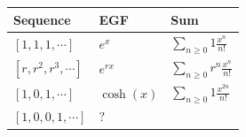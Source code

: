 \begin{longtable}[]{@{}lll@{}}
\toprule
\begin{minipage}[b]{0.30\columnwidth}\raggedright
Sequence\strut
\end{minipage} & \begin{minipage}[b]{0.30\columnwidth}\raggedright
EGF\strut
\end{minipage} & \begin{minipage}[b]{0.30\columnwidth}\raggedright
Sum\strut
\end{minipage}\tabularnewline
\midrule
\endhead
\begin{minipage}[t]{0.30\columnwidth}\raggedright
\([1, 1, 1, \cdots]\)\strut
\end{minipage} & \begin{minipage}[t]{0.30\columnwidth}\raggedright
\(e^x\)\strut
\end{minipage} & \begin{minipage}[t]{0.30\columnwidth}\raggedright
\(\displaystyle\sum_{n\geq 0}1 \frac {x^n} {n!}\)\strut
\end{minipage}\tabularnewline
\begin{minipage}[t]{0.30\columnwidth}\raggedright
\([r, r^2, r^3, \cdots]\)\strut
\end{minipage} & \begin{minipage}[t]{0.30\columnwidth}\raggedright
\(e^{rx}\)\strut
\end{minipage} & \begin{minipage}[t]{0.30\columnwidth}\raggedright
\(\displaystyle\sum_{n\geq 0}r^n\frac {x^n} {n!}\)\strut
\end{minipage}\tabularnewline
\begin{minipage}[t]{0.30\columnwidth}\raggedright
\([1, 0, 1, \cdots]\)\strut
\end{minipage} & \begin{minipage}[t]{0.30\columnwidth}\raggedright
\(\cosh(x)\)\strut
\end{minipage} & \begin{minipage}[t]{0.30\columnwidth}\raggedright
\(\displaystyle\sum_{n\geq 0}1 \frac {x^{2n}} {n!}\)\strut
\end{minipage}\tabularnewline
\begin{minipage}[t]{0.30\columnwidth}\raggedright
\([1, 0, 0, 1, \cdots]\)\strut
\end{minipage} & \begin{minipage}[t]{0.30\columnwidth}\raggedright
\(?\)\strut
\end{minipage} & \begin{minipage}[t]{0.30\columnwidth}\raggedright

\end{minipage}
\end{longtable}
